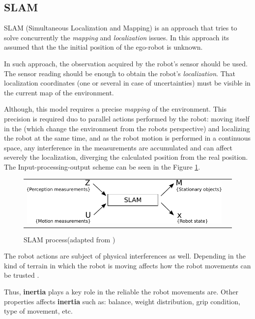 \subsection{SLAM}

SLAM (Simultaneous Localization and Mapping) is an approach that tries to solve concurrently the \textit{mapping} and \textit{localization} issues\cite{VU-2009-454238}. In this approach its assumed that the the initial position of the ego-robot is unknown. 

In such approach,  the observation acquired by the robot's sensor should be used. The sensor reading should be enough to obtain the robot's \textit{localization}. That localization coordinates (one or several in case of uncertainties) must be visible in the current map of the environment. 

Although, this model requires a precise \textit{mapping} of the environment. This precision is required duo to parallel actions performed by the robot: moving itself in the (which change the environment from the robots perspective) and localizing the robot at the same time, and as the robot motion is performed in a continuous space, any interference in the measurements are accumulated and can affect severely the localization, diverging the calculated position from the real position. The Input-processing-output scheme can be seen in the Figure \ref{fig:perception:slam}.

\begin{figure}[h]
   \centering
     \begin{tabular}{lr}
       \includegraphics[scale=0.9]{img/fig:perception:slam}
     \end{tabular}
   \caption{SLAM process(adapted from \cite{Wang04a})}
   \label{fig:perception:slam}
\end{figure}

The robot actions are subject of physical interferences as well. Depending in the kind of terrain in which the robot is moving affects how the robot movements can be trusted \cite{DBLP:conf/icra/LenainTHM11}. 

Thus, \textbf{inertia} plays a key role in the reliable the robot movements are. Other properties affects \textbf{inertia} such as: balance, weight distribution, grip condition, type of movement, etc.

